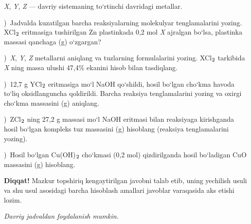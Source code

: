 \documentclass[11pt,a4paper]{article}
\renewcommand{\textsubscript}[1]{\ensuremath{_{\text{\fontsize{8}{8}\selectfont #1}}}}
\newcommand{\qsep}{\par\vspace{13pt}}
\newcommand{\diqqat}[1]{\par\smallskip\noindent\textbf{Diqqat!} #1\par\medskip}
\newcommand{\hdrpill}[1]{\begin{tikzpicture}[baseline=0pt]\node[fill=ygreen,text=white,rounded corners=8pt,inner xsep=10pt,inner ysep=5pt,font=\fontsize{13}{15}\bfseries\selectfont] at (0,0.475){#1};\end{tikzpicture}}
\newcommand{\curvar}{}\fancyhead[R]{\hdrpill{\curvar}}
\begin{document}
\textit{X}, \textit{Y}, \textit{Z} --- davriy sistemaning to`rtinchi davridagi metallar.\par
{})\ Jadvalda kuzatilgan barcha reaksiyalarning molekulyar tenglamalarini yozing. XCl\textsubscript{2} eritmasiga tushirilgan Zn plastinkada 0,2 mol \textit{X} ajralgan bo`lsa, plastinka massasi qanchaga (g) o`zgargan?\par
{})\ \textit{X}, \textit{Y}, \textit{Z} metallarni aniqlang va tuzlarning formulalarini yozing. XCl\textsubscript{2} tarkibida \textit{X} ning massa ulushi 47,4\% ekanini hisob bilan tasdiqlang.\par
{})\ 12,7 g YCl\textsubscript{2} eritmasiga mo`l NaOH qo`shildi, hosil bo`lgan cho`kma havoda to`liq oksidlanguncha qoldirildi. Barcha reaksiya tenglamalarini yozing va oxirgi cho`kma massasini (g) aniqlang.\par
{})\ ZCl\textsubscript{2} ning 27,2 g massasi mo`l NaOH eritmasi bilan reaksiyaga kirishganda hosil bo`lgan kompleks tuz massasini (g) hisoblang (reaksiya tenglamalarini yozing).\par
{})\ Hosil bo`lgan Cu(OH)\textsubscript{2} cho`kmasi (0,2 mol) qizdirilganda hosil bo`ladigan CuO massasini (g) hisoblang.\par
\diqqat{Mazkur topshiriq kengaytirilgan javobni talab etib, uning yechilish usuli va shu usul asosidagi barcha hisoblash amallari javoblar varaqasida aks etishi lozim.}\qsep
\newpage
\renewcommand{\curvar}{11-variant}
\thispagestyle{first}
\noindent\textit{Davriy jadvaldan foydalanish mumkin.}
\par\smallskip
\end{document}
